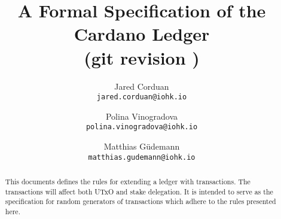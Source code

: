 
\title{A Formal Specification of the Cardano Ledger \\
       {\small (git revision \gitFirstTagDescribe)}}

\author{Jared Corduan  \\ {\small \texttt{jared.corduan@iohk.io}} \\
   \and Polina Vinogradova \\ {\small \texttt{polina.vinogradova@iohk.io}} \\
   \and Matthias G\"udemann  \\ {\small \texttt{matthias.gudemann@iohk.io}}}


\maketitle

\begin{abstract}
This documents defines the rules for extending a ledger with transactions.
The transactions will affect both UTxO and stake delegation.
It is intended to serve as the specification for random generators of transactions
which adhere to the rules presented here.
\end{abstract}
